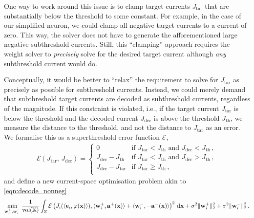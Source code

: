 One way to work around this issue is to clamp target currents $J_\mathrm{tar}$ that are substantially below the threshold to some constant.
For example, in the case of our simplified \LIF neuron, we could clamp all negative target currents to a current of zero.
This way, the solver does not have to generate the afforementioned large negative subthreshold currents.
Still, this \enquote{clamping} approach requires the weight solver to \emph{precisely} solve for the desired target current although \emph{any} subthreshold current would do.

Conceptually, it would be better to \enquote{relax} the requirement to solve for $J_\mathrm{tar}$ as precisely as possible for subthreshold currents.
Instead, we could merely demand that subthreshold target currents are decoded as subthreshold currents, regardless of the magnitude.
If this constraint is violated, i.e., if the target current $J_\mathrm{tar}$ is below the threshold and the decoded current $J_\mathrm{dec}$ is above the threshold $J_\mathrm{th}$, we measure the distance to the threshold, and not the distance to $J_\mathrm{tar}$ as an error.
We formalise this as a superthreshold error function $\mathcal{E}$,
\begin{align}
\mathcal{E}(J_\mathrm{tar}, \, J_\mathrm{dec}) = \begin{cases}
0 & \text{if } J_\mathrm{tar} < J_\mathrm{th} \text{ and } J_\mathrm{dec} < J_\mathrm{th} \,,\\
J_\mathrm{dec} - J_\mathrm{th} & \text{if } J_\mathrm{tar} < J_\mathrm{th} \text{ and } J_\mathrm{dec} > J_\mathrm{th} \,,\\
J_\mathrm{dec} - J_\mathrm{tar} & \text{if } J_\mathrm{tar} \geq J_\mathrm{th} \,,\\
\end{cases}
\label{eqn:subthreshold_error}
\end{align}
and define a new current-space optimisation problem akin to \cref{eqn:decode_nonneg}
\begin{align}
	\min_{\mathbf{w}_i^+, \mathbf{w}_i^-} 
	\frac{1}{\operatorname{vol}(\mathbb{X})}
	\int_{\mathbb{X}} \mathcal{E}\left( 
		J_i(\langle \mathbf{e}_i, \varphi(\mathbf{x})\rangle),
		\langle \mathbf{w}_i^+, \mathbf{a}^+(\mathbf{x}) \rangle +
		\langle \mathbf{w}_i^-, -\mathbf{a}^-(\mathbf{x}) \rangle
	\right)^2 \, \mathrm{d} \mathbf{x}
	+ \sigma^2 \| \mathbf{w}^+_i \|_\mathrm{2}^2
	+ \sigma^2 \| \mathbf{w}^-_i \|_\mathrm{2}^2\,.
\label{eqn:decode_current_subthreshold}
\end{align}

